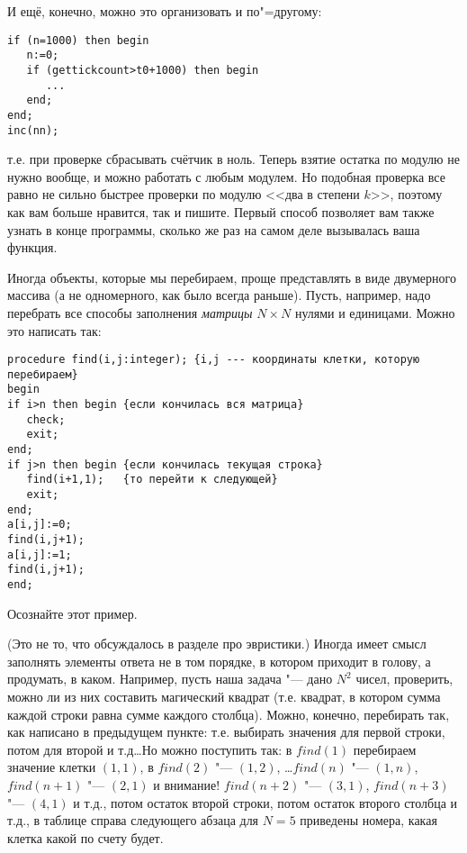 И ещё, конечно, можно это организовать и по"=другому:
\begin{codesampleo}\begin{verbatim}
if (n=1000) then begin
   n:=0;
   if (gettickcount>t0+1000) then begin
      ...
   end;
end;
inc(nn);
\end{verbatim}
\end{codesampleo}
т.е. при проверке сбрасывать счётчик в ноль. Теперь взятие остатка по модулю не нужно вообще, и можно работать с любым модулем. Но подобная проверка все равно не сильно быстрее проверки по модулю <<два в степени $k$>>, поэтому как вам больше нравится, так и пишите. Первый способ позволяет вам также узнать в конце программы, сколько же раз на самом деле вызывалась ваша функция.

 Иногда объекты, которые мы перебираем, проще представлять в виде двумерного 
массива (а не одномерного, как было всегда раньше). Пусть, например, надо 
перебрать все способы заполнения \textit{матрицы} $N\times N$ нулями и единицами. Можно это 
написать так:

\begin{codesampleo}\begin{verbatim}
procedure find(i,j:integer); {i,j --- координаты клетки, которую перебираем}
begin
if i>n then begin {если кончилась вся матрица}
   check;
   exit;
end;
if j>n then begin {если кончилась текущая строка}
   find(i+1,1);   {то перейти к следующей} 
   exit;
end;
a[i,j]:=0;
find(i,j+1);
a[i,j]:=1;
find(i,j+1);
end;
\end{verbatim}
\end{codesampleo}

Осознайте этот пример.

(Это не то, что обсуждалось в разделе про эвристики.) Иногда имеет смысл 
заполнять элементы ответа не в том порядке, в котором приходит в голову, а продумать, 
в каком. Например, пусть наша задача "--- дано $N^2$ чисел, проверить, можно ли из 
них составить магический квадрат (т.е. квадрат, в котором сумма каждой строки 
равна сумме каждого столбца). Можно, конечно, перебирать так, как написано в 
предыдущем пункте: т.е. выбирать значения для первой строки, потом для второй и 
т.д\dots Но можно поступить так: в $find(1)$ перебираем значение клетки $(1,1)$, в 
$find(2)$ "--- $(1,2)$, \dots $find(n)$ "--- $(1,n)$, $find(n+1)$ "--- $(2,1)$ и внимание! 
$find(n+2)$ "--- $(3,1)$, $find(n+3)$ "--- $(4,1)$ и т.д., потом остаток второй строки, 
потом остаток второго столбца и т.д., в таблице справа следующего абзаца для $N=5$ приведены номера, какая клетка какой по счету будет.

